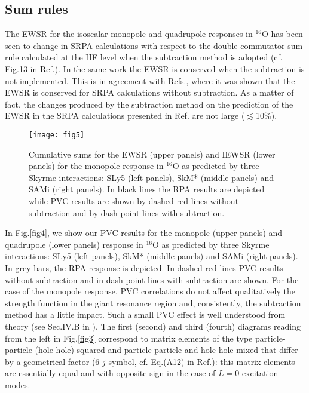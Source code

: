 \documentclass[12pt,a4paper,final]{iopart}
\begin{document}
\subsection{Sum rules}

The EWSR for the isoscalar monopole and quadrupole responses in ${}^{16}$O has been seen to change in SRPA calculations with respect to the double commutator sum rule calculated at the HF level when the subtraction method is adopted (cf. Fig.13 in Ref.\cite{gambacurta2015}). In the same work the EWSR is conserved when the subtraction is not implemented. This  is in agreement with Refs.\cite{yannouleas1987,wambach1990}, where it was shown that the EWSR is conserved for SRPA calculations without subtraction. As a matter of fact, the changes produced by the subtraction method on the prediction of the EWSR in the SRPA calculations presented in Ref.\cite{gambacurta2015} are not large ($\lesssim$10\%).

\begin{figure}[t!]                    
\texttt{[image: fig5]}
\caption{Cumulative sums for the EWSR (upper panels) and IEWSR (lower panels) for the monopole response in ${}^{16}$O as predicted by three Skyrme interactions: SLy5 \cite{sly5} (left panels), SkM* \cite{skm} (middle panels) and SAMi \cite{sami} (right panels). In black lines the RPA results are depicted while PVC results are shown by dashed red lines without subtraction and by dash-point lines with subtraction.} 
\label{fig5} 
\end{figure}

In Fig.\ref{fig4}, we show our PVC results for the monopole (upper panels) and quadrupole (lower panels) response in ${}^{16}$O as predicted by three Skyrme interactions: SLy5 (left panels), SkM* (middle panels) and SAMi (right panels). In grey bars, the RPA response is depicted. In dashed red lines PVC results without subtraction and in dash-point lines with subtraction are shown. For the case of the monopole response, PVC correlations do not affect qualitatively the strength function in the giant resonance region and, consistently, the subtraction method has a little impact. Such a small PVC effect is well understood from theory (see Sec.IV.B in \cite{bertsch1983}). The first (second) and third (fourth) diagrams reading from the left in Fig.\ref{fig3} correspond to matrix elements of the type particle-particle (hole-hole) squared and particle-particle and hole-hole mixed that differ by a geometrical factor (6-$j$ symbol, cf. Eq.(A12) in Ref.\cite{colo1994}): this matrix elements are essentially equal and with opposite sign in the case of $L=0$ excitation modes.     
\end{document}
